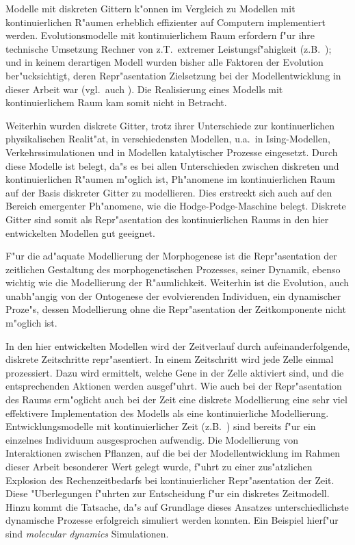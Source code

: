 Modelle mit diskreten Gittern k"onnen im Vergleich zu Modellen mit kontinuierlichen
R"aumen erheblich effizienter auf Computern implementiert werden.
Evolutionsmodelle mit kontinuierlichem Raum erfordern f"ur ihre technische Umsetzung
Rechner von z.T.\ extremer Leistungsf"ahigkeit (z.B.\ \cite{Sims95}); und in
keinem derartigen Modell wurden bisher alle Faktoren der Evolution ber"ucksichtigt,
deren Repr"asentation Zielsetzung bei der Modellentwicklung in dieser
Arbeit war (vgl.\ auch \cite{Terzopoulos95}).
Die Realisierung eines Modells mit kontinuierlichem Raum kam somit nicht in Betracht.

Weiterhin wurden diskrete Gitter, trotz ihrer Unterschiede zur kontinuerlichen
physikalischen Realit"at, in
verschiedensten Modellen, u.a.\ in Ising-Modellen,
Verkehrssimulationen und in Modellen katalytischer
Prozesse \cite{Gerhardt89} eingesetzt. Durch diese Modelle ist belegt, da"s
es bei allen Unterschieden zwischen diskreten und kontinuierlichen R"aumen
m"oglich ist, Ph"anomene im kontinuierlichen Raum auf der Basis diskreter
Gitter zu modellieren. Dies erstreckt sich auch auf den Bereich emergenter
Ph"anomene, wie die Hodge-Podge-Maschine \cite{Gerhardt89} belegt. Diskrete Gitter
sind somit als Repr"asentation des kontinuierlichen Raums in den hier entwickelten
Modellen gut geeignet.

F"ur die ad"aquate Modellierung der Morphogenese ist die Repr"asentation der
zeitlichen Gestaltung des morphogenetischen Prozesses, seiner Dynamik, ebenso wichtig
wie die Modellierung der R"aumlichkeit. Weiterhin ist die Evolution, auch unabh"angig
von der Ontogenese der evolvierenden Individuen, ein dynamischer Proze"s, dessen
Modellierung ohne die Repr"asentation der Zeitkomponente nicht m"oglich ist.

In den hier entwickelten Modellen wird
der Zeitverlauf durch aufeinanderfolgende, diskrete Zeitschritte repr"asentiert.
In einem Zeitschritt wird jede Zelle einmal prozessiert. Dazu wird ermittelt,
welche Gene in der Zelle aktiviert sind, und die entsprechenden Aktionen werden
ausgef"uhrt. Wie auch bei der Repr"asentation des Raums erm"oglicht auch bei der
Zeit eine diskrete Modellierung eine sehr viel effektivere Implementation des Modells
als eine kontinuierliche Modellierung. Entwicklungsmodelle mit kontinuierlicher
Zeit (z.B.\ \cite{Prusinkiewicz94}) sind bereits f"ur ein einzelnes Individuum
ausgesprochen aufwendig. Die Modellierung von Interaktionen zwischen Pflanzen,
auf die bei der Modellentwicklung im Rahmen dieser Arbeit besonderer Wert gelegt
wurde, f"uhrt zu einer zus"atzlichen Explosion des Rechenzeitbedarfs bei
kontinuierlicher Repr"asentation der Zeit. Diese "Uberlegungen f"uhrten zur
Entscheidung f"ur ein diskretes Zeitmodell. Hinzu kommt die Tatsache, da"s
auf Grundlage dieses Ansatzes unterschiedlichste dynamische Prozesse erfolgreich
simuliert werden konnten. Ein Beispiel hierf"ur sind {\slshape molecular dynamics}
Simulationen.

